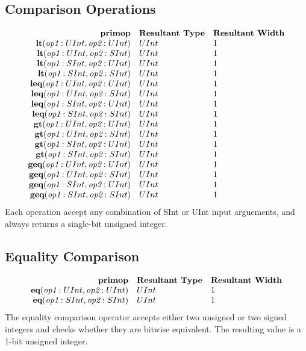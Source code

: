 \documentclass[12pt]{article}
\begin{document}
\subsection{Comparison Operations}
\[
\begin{array}{rll}
\text{\bf primop} & \text{\bf Resultant Type} & \text{\bf Resultant Width} \\
\text{\bf lt}      (\text{\em op1}:UInt, \text{\em op2}:UInt) & UInt & 1    \\
\text{\bf lt}      (\text{\em op1}:UInt, \text{\em op2}:SInt) & UInt & 1    \\
\text{\bf lt}      (\text{\em op1}:SInt, \text{\em op2}:UInt) & UInt & 1    \\
\text{\bf lt}      (\text{\em op1}:SInt, \text{\em op2}:SInt) & UInt & 1    \\
\text{\bf leq}     (\text{\em op1}:UInt, \text{\em op2}:UInt) & UInt & 1    \\
\text{\bf leq}     (\text{\em op1}:UInt, \text{\em op2}:SInt) & UInt & 1    \\
\text{\bf leq}     (\text{\em op1}:SInt, \text{\em op2}:UInt) & UInt & 1    \\
\text{\bf leq}     (\text{\em op1}:SInt, \text{\em op2}:SInt) & UInt & 1    \\
\text{\bf gt}      (\text{\em op1}:UInt, \text{\em op2}:UInt) & UInt & 1    \\
\text{\bf gt}      (\text{\em op1}:UInt, \text{\em op2}:SInt) & UInt & 1    \\
\text{\bf gt}      (\text{\em op1}:SInt, \text{\em op2}:UInt) & UInt & 1    \\
\text{\bf gt}      (\text{\em op1}:SInt, \text{\em op2}:SInt) & UInt & 1    \\
\text{\bf geq}     (\text{\em op1}:UInt, \text{\em op2}:UInt) & UInt & 1    \\
\text{\bf geq}     (\text{\em op1}:UInt, \text{\em op2}:SInt) & UInt & 1    \\
\text{\bf geq}     (\text{\em op1}:SInt, \text{\em op2}:UInt) & UInt & 1    \\
\text{\bf geq}     (\text{\em op1}:SInt, \text{\em op2}:SInt) & UInt & 1    \\
\end{array}
\]
Each operation accept any combination of SInt or UInt input arguements, and always returns a single-bit unsigned integer.

\subsection{Equality Comparison}
\[
\begin{array}{rll}
\text{\bf primop} & \text{\bf Resultant Type} & \text{\bf Resultant Width} \\
\text{\bf eq}(\text{\em op1}:UInt, \text{\em op2}:UInt)     & UInt & 1 \\
\text{\bf eq}(\text{\em op1}:SInt, \text{\em op2}:SInt)     & UInt & 1 \\
\end{array}
\]
The equality comparison operator accepts either two unsigned or two signed integers and checks whether they are bitwise equivalent.
The resulting value is a 1-bit unsigned integer. 
\end{document}
